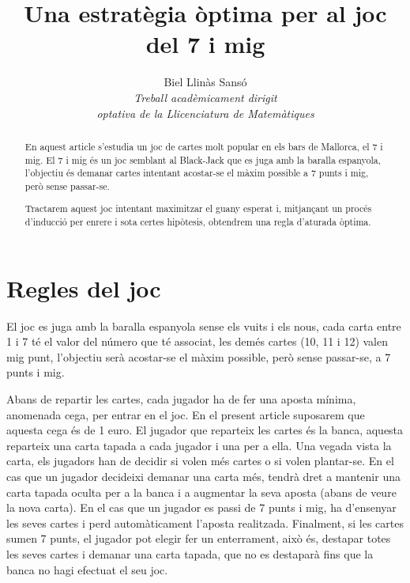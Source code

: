 \documentclass[9pt]{IEEEtran}
\begin{document}
\pagestyle{empty}
%
\title{Una estratègia òptima per al joc del 7 i mig}
\author{Biel Llinàs Sansó\\
\vspace{0.5cm}
\textit{Treball acadèmicament dirigit \\ optativa de la Llicenciatura de Matemàtiques}}
\maketitle
\thispagestyle{empty}

\begin{abstract}
En aquest article s'estudia un joc de cartes molt popular en els bars de Mallorca, el 7 i mig. El 7 i mig és un joc semblant al Black-Jack que es juga amb la baralla espanyola, l'objectiu és demanar cartes intentant acostar-se el màxim possible a 7 punts i mig, però sense passar-se.

Tractarem aquest joc intentant maximitzar el guany esperat i, mitjançant un procés d'inducció per enrere i sota certes hipòtesis, obtendrem una regla d'aturada òptima.
\end{abstract}


\section{Regles del joc}

El joc es juga amb la baralla espanyola sense els vuits i els nous, cada carta entre 1 i 7 té el valor del número que té associat, les demés cartes (10, 11 i 12) valen mig punt, l'objectiu serà acostar-se el màxim possible, però sense passar-se, a 7 punts i mig.

Abans de repartir les cartes, cada jugador ha de fer una aposta mínima, anomenada cega, per entrar en el joc. En el present article suposarem que aquesta cega és de 1 euro. El jugador que reparteix les cartes és la banca, aquesta reparteix una carta tapada a cada jugador i una per a ella. Una vegada vista la carta, els jugadors han de decidir si volen més cartes o si volen plantar-se. En el cas que un jugador decideixi demanar una carta més, tendrà dret a mantenir una carta tapada oculta per a la banca i a augmentar la seva aposta (abans de veure la nova carta). En el cas que un jugador es passi de 7 punts i mig, ha d'ensenyar les seves cartes i perd automàticament l'aposta realitzada. Finalment, si les cartes sumen 7 punts, el jugador pot elegir fer un enterrament, això és, destapar totes les seves cartes i demanar una carta tapada, que no es destaparà fins que la banca no hagi efectuat el seu joc.
\end{document}

